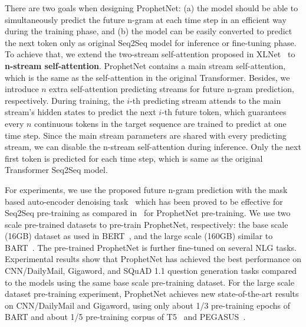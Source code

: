 \documentclass[11pt,a4paper]{article}
\begin{document}
There are two goals when designing ProphetNet: (a) the model should be able to simultaneously predict the future n-gram at each time step in an efficient way during the training phase, and (b) the model can be easily converted to predict the next token only as original Seq2Seq model for inference or fine-tuning phase.
To achieve that, we extend the two-stream self-attention proposed in XLNet~\cite{yang2019xlnet} to \textbf{n-stream self-attention}.
ProphetNet contains a main stream self-attention, which is the same as the self-attention in the original Transformer. 
Besides, we introduce $n$ extra self-attention predicting streams for future n-gram prediction, respectively. 
During training, the $i$-th predicting stream attends to the main stream's hidden states to predict the next $i$-th future token, which guarantees every $n$ continuous tokens in the target sequence are trained to predict at one time step.
Since the main stream parameters are shared with every predicting stream, we can disable the n-stream self-attention during inference. Only the next first token is predicted for each time step, which is same as the original Transformer Seq2Seq model.

For experiments, we use the proposed future n-gram prediction with the mask based auto-encoder denoising task~\cite{song2019mass,lewis2019bart} which has been proved to be effective for Seq2Seq pre-training as compared in~\citet{raffel2019exploring} for ProphetNet pre-training.  
We use two scale pre-trained datasets to pre-train ProphetNet, respectively: the base scale (16GB) dataset as used in BERT~\cite{devlin2018bert}, and the large scale (160GB) similar to BART~\cite{lewis2019bart}. 
The pre-trained ProphetNet is further fine-tuned on several NLG tasks.
Experimental results show that ProphetNet has achieved the best performance on CNN/DailyMail, Gigaword, and SQuAD 1.1 question generation tasks compared to the models using the same base scale pre-training dataset. 
For the large scale dataset pre-training experiment, ProphetNet achieves new state-of-the-art results on CNN/DailyMail and Gigaword, using only about 1/3 pre-training epochs of BART and about 1/5 pre-training corpus of T5~\cite{raffel2019exploring} and PEGASUS~\cite{zhang2019pegasus}.
\end{document}
